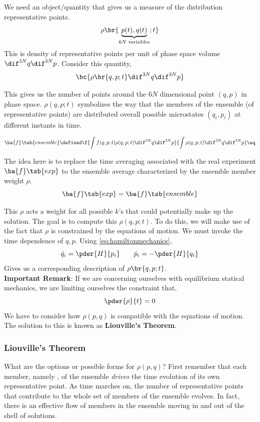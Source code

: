 \documentclass{article}
\begin{document}
We need an object/quantity that gives us a measure of the distribution representative points.
\[ \rho \br{\underbrace{p(t), q(t)}_{6N \text{ variables}}; t} \]
This is density of representative points per unit of phase space volume $\dif^{3N} q \dif^{3N} p$. Consider this quantity,
\[ \bc{\rho \br{q,p;t} \dif^{3N} q \dif^{3N} p} \]

This gives us the number of points around the $6N$ dimensional point $(q,p)$ in phase space. $\rho(q,p;t)$ symbolizes the way that the members of the ensemble (of representative points) are distributed overall possible microstates $(q_i, p_i)$ at different instants in time.

\[ \ba{f}\tsb{ensemble} \defined \f{\int f(q,p;t) \rho(q,p;t) \dif^{3N}q\dif^{3N}p}{\int\rho(q,p;t) \dif^{3N}q\dif^{3N}p} \eq \label{eq:fensemble} \]

The idea here is to replace the time averaging associated with the real experiment $\ba{f}\tsb{exp}$ to the ensemble average characterized by the ensemble member weight $\rho$.
\[ \ba{f}\tsb{exp} = \ba{f}\tsb{ensemble} \]

This $\rho$ acts a weight for all possible $k$'s that could potentially make up the solution. The goal is to compute this $\rho(q,p;t)$. To do this, we will make use of the fact that $\rho$ is constrained by the equations of motion. We must invoke the time dependence of $q,p$. Using \eqref{eq:hamiltonmechanics},
\[ \dot{q}_i = \pder{H}{p_i} \qquad \dot{p}_i = -\pder{H}{q_i} \]
Gives us a corresponding description of $\rho\br{q,p;t}$. \\

\textbf{Important Remark}: If we are concerning ourselves with equilibrium statical mechanics, we are limiting ourselves the constraint that,
\[ \pder{\rho}{t} = 0 \]
We have to consider how $\rho(p,q)$ is compatible with the equations of motion. The solution to this is known as \textbf{Liouville's Theorem}.

\subsubsection{Liouville's Theorem}
What are the options or possible forms for $\rho(p, q)$? First remember that each member, namely , of the ensemble \textit{drives} the time evolution of its own representative point. As time marches on, the number of representative points that contribute to the whole set of members of the ensemble evolves. In fact, there is an effective flow of members in the ensemble moving in and out of the shell of solutions.
\end{document}
